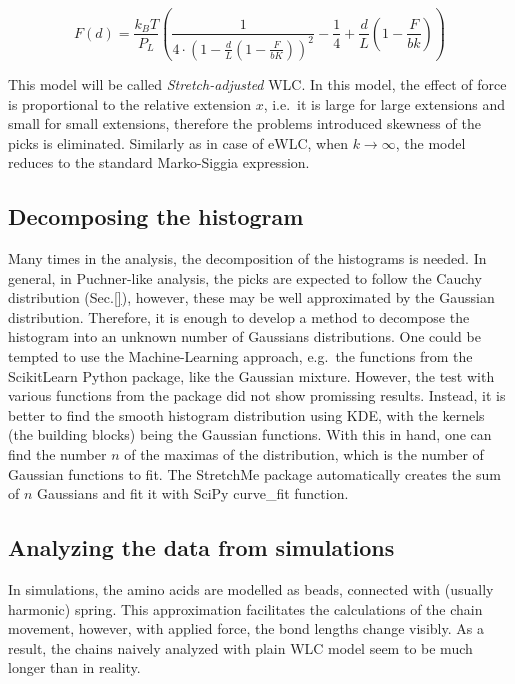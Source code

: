 \begin{equation}
    \boxed{F(d)=\frac{k_{B}T}{P_L}\left(\frac{1}{4\cdot(1-\frac{d}{L}(1-\frac{F}{bK}))^2} - \frac{1}{4} + \frac{d}{L}(1-\frac{F}{bk})\right)}
    \label{eq:results-approach-stretch-adjusted}
\end{equation}

This model will be called \textit{Stretch-adjusted} WLC\@.
In this model, the effect of force is proportional to the relative extension $x$, i.e.\ it is large for large extensions and small for small extensions, therefore the problems introduced skewness of the picks is eliminated.
Similarly as in case of eWLC, when $k\rightarrow\infty$, the model reduces to the standard Marko-Siggia expression.

\subsection{Decomposing the histogram}
\label{subsec:results-approach-decomposition}
Many times in the analysis, the decomposition of the histograms is needed.
In general, in Puchner-like analysis, the picks are expected to follow the Cauchy distribution (Sec.\ref{}), however, these may be well approximated by the Gaussian distribution.
Therefore, it is enough to develop a method to decompose the histogram into an unknown number of Gaussians distributions.
One could be tempted to use the Machine-Learning approach, e.g.\ the functions from the ScikitLearn Python package, like the Gaussian mixture.
However, the test with various functions from the package did not show promissing results.
Instead, it is better to find the smooth histogram distribution using KDE, with the kernels (the building blocks) being the Gaussian functions.
With this in hand, one can find the number $n$ of the maximas of the distribution, which is the number of Gaussian functions to fit.
The StretchMe package automatically creates the sum of $n$ Gaussians and fit it with SciPy curve\_fit function.

\subsection{Analyzing the data from simulations}
\label{subsec:results-approach-theory}
In simulations, the amino acids are modelled as beads, connected with (usually harmonic) spring.
This approximation facilitates the calculations of the chain movement, however, with applied force, the bond lengths change visibly.
As a result, the chains naively analyzed with plain WLC model seem to be much longer than in reality.

